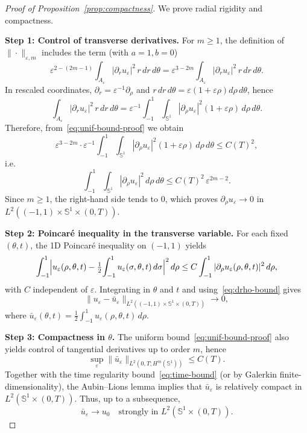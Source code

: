 \documentclass[11pt]{amsart}
\theoremstyle{plain}
\theoremstyle{definition}
\theoremstyle{remark}
\theoremstyle{remark}
\begin{document}
\begin{proof}[Proof of Proposition~\ref{prop:compactness}]
We prove radial rigidity and compactness.

\smallskip
\noindent\textbf{Step 1: Control of transverse derivatives.}
For \(m\ge1\), the definition of \(\|\cdot\|_{\varepsilon,m}\) includes the term
(with \(a=1,b=0\))
\[
\varepsilon^{2-(2m-1)}\int_{A_\varepsilon}|\partial_r u_\varepsilon|^2\,r\,dr\,d\theta
=
\varepsilon^{3-2m}\int_{A_\varepsilon}|\partial_r u_\varepsilon|^2\,r\,dr\,d\theta.
\]
In rescaled coordinates, \(\partial_r=\varepsilon^{-1}\partial_\rho\) and
\(r\,dr\,d\theta=\varepsilon(1+\varepsilon\rho)d\rho\,d\theta\), hence
\[
\int_{A_\varepsilon}|\partial_r u_\varepsilon|^2\,r\,dr\,d\theta
=
\varepsilon^{-1}\int_{-1}^1\!\!\int_{\mathbb S^1}
|\partial_\rho u_\varepsilon|^2(1+\varepsilon\rho)\,d\rho\,d\theta.
\]
Therefore, from~\eqref{eq:unif-bound-proof} we obtain
\[
\varepsilon^{3-2m}\cdot \varepsilon^{-1}
\int_{-1}^1\!\!\int_{\mathbb S^1}
|\partial_\rho u_\varepsilon|^2(1+\varepsilon\rho)\,d\rho\,d\theta
\le C(T)^2,
\]
i.e.
\begin{equation}
\label{eq:drho-bound}
\int_{-1}^1\!\!\int_{\mathbb S^1}
|\partial_\rho u_\varepsilon|^2\,d\rho\,d\theta
\le C(T)^2\,\varepsilon^{2m-2}.
\end{equation}
Since \(m\ge1\), the right-hand side tends to \(0\), which proves
\(\partial_\rho u_\varepsilon\to0\) in \(L^2((-1,1)\times\mathbb S^1\times(0,T))\).

\smallskip
\noindent\textbf{Step 2: Poincar\'e inequality in the transverse variable.}
For each fixed \((\theta,t)\), the 1D Poincar\'e inequality on \((-1,1)\) yields
\[
\int_{-1}^1\Bigl|u_\varepsilon(\rho,\theta,t)-\tfrac12\!\int_{-1}^1u_\varepsilon(\sigma,\theta,t)\,d\sigma\Bigr|^2\,d\rho
\le C\int_{-1}^1|\partial_\rho u_\varepsilon(\rho,\theta,t)|^2\,d\rho,
\]
with \(C\) independent of \(\varepsilon\).
Integrating in \(\theta\) and \(t\) and using~\eqref{eq:drho-bound} gives
\begin{equation}
\label{eq:transverse-avg}
\|u_\varepsilon-\bar u_\varepsilon\|_{L^2((-1,1)\times\mathbb S^1\times(0,T))}
\longrightarrow 0,
\end{equation}
where
\(\bar u_\varepsilon(\theta,t)=\tfrac12\int_{-1}^1 u_\varepsilon(\rho,\theta,t)\,d\rho\).

\smallskip
\noindent\textbf{Step 3: Compactness in \(\theta\).}
The uniform bound~\eqref{eq:unif-bound-proof} also yields control of tangential
derivatives up to order \(m\), hence
\[
\sup_{\varepsilon}\|\bar u_\varepsilon\|_{L^2(0,T;H^m(\mathbb S^1))}\le C(T).
\]
Together with the time regularity bound~\eqref{eq:time-bound} (or by Galerkin
finite-dimensionality), the Aubin--Lions lemma implies that \(\bar u_\varepsilon\)
is relatively compact in \(L^2(\mathbb S^1\times(0,T))\).
Thus, up to a subsequence,
\[
\bar u_\varepsilon \to u_0 \quad\text{strongly in }L^2(\mathbb S^1\times(0,T)).
\]


\end{proof}
\end{document}
